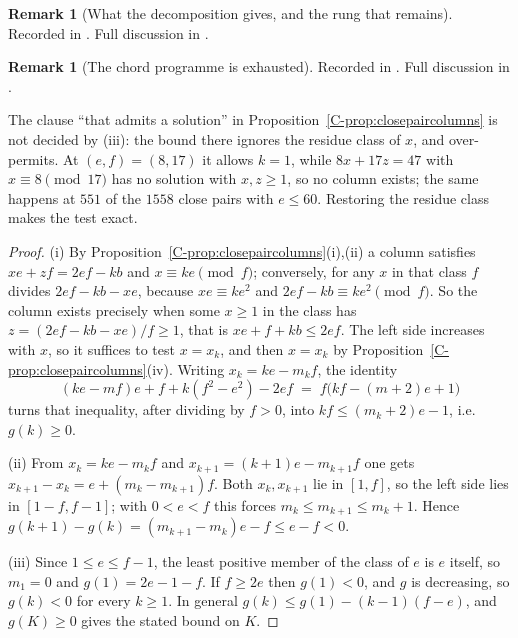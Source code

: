 \documentclass[11pt,reqno]{amsart}
\theoremstyle{plain}
\theoremstyle{definition}
\newtheorem{remark}[theorem]{Remark}
\begin{document}
\begin{remark}[What the decomposition gives, and the rung that remains]\label{rem:chordscope}
Recorded in \cite{Obstructions}. Full discussion in \cite{Obstructions}.
\end{remark}

\begin{remark}[The chord programme is exhausted]\label{rem:chordexhausted}
Recorded in \cite{Obstructions}. Full discussion in \cite{Obstructions}.
\end{remark}








The clause ``that admits a solution'' in Proposition~\ref{C-prop:closepaircolumns} is not decided by
(iii): the bound there ignores the residue class of $x$, and over-permits. At $(e,f)=(8,17)$ it
allows $k=1$, while $8x+17z=47$ with $x\equiv8\pmod{17}$ has no solution with $x,z\ge1$, so no
column exists; the same happens at $551$ of the $1558$ close pairs with $e\le60$. Restoring the
residue class makes the test exact.


\begin{proof}
(i) By Proposition~\ref{C-prop:closepaircolumns}(i),(ii) a column satisfies $xe+zf=2ef-kb$ and
$x\equiv ke\pmod f$; conversely, for any $x$ in that class $f$ divides $2ef-kb-xe$, because
$xe\equiv ke^2$ and $2ef-kb\equiv ke^2 \pmod f$. So the column exists precisely when some $x\ge1$ in
the class has $z=(2ef-kb-xe)/f\ge1$, that is $xe+f+kb\le 2ef$. The left side increases with $x$, so
it suffices to test $x=x_k$, and then $x=x_k$ by Proposition~\ref{C-prop:closepaircolumns}(iv).
Writing $x_k=ke-m_kf$, the identity
\[
(ke-mf)e+f+k(f^2-e^2)-2ef \;=\; f\bigl(kf-(m+2)e+1\bigr)
\]
turns that inequality, after dividing by $f>0$, into $kf\le(m_k+2)e-1$, i.e.\ $g(k)\ge0$.

(ii) From $x_k=ke-m_kf$ and $x_{k+1}=(k+1)e-m_{k+1}f$ one gets
$x_{k+1}-x_k=e+(m_k-m_{k+1})f$. Both $x_k,x_{k+1}$ lie in $[1,f]$, so the left side lies in
$[1-f,f-1]$; with $0<e<f$ this forces $m_k\le m_{k+1}\le m_k+1$. Hence
$g(k+1)-g(k)=(m_{k+1}-m_k)e-f\le e-f<0$.

(iii) Since $1\le e\le f-1$, the least positive member of the class of $e$ is $e$ itself, so
$m_1=0$ and $g(1)=2e-1-f$. If $f\ge2e$ then $g(1)<0$, and $g$ is decreasing, so $g(k)<0$ for every
$k\ge1$. In general $g(k)\le g(1)-(k-1)(f-e)$, and $g(K)\ge0$ gives the stated bound on $K$.
\end{proof}
\end{document}
